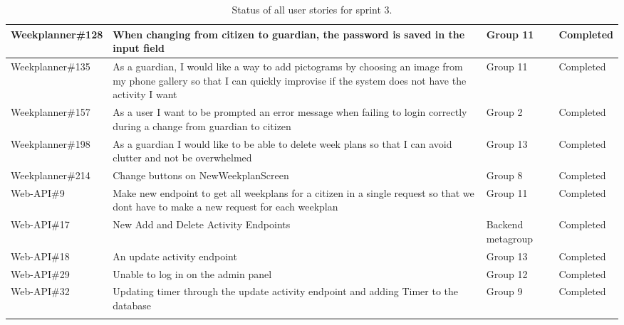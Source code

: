 \begin{longtable}{|p{2.9cm}|p{8cm}|p{2cm}|p{2cm}|}
    Weekplanner\#128 & When changing from citizen to guardian, the password is saved in the input field                                                                                                        & Group 11     & Completed    \\ \hline
    Weekplanner\#135 & As a guardian, I would like a way to add pictograms by choosing an image from my phone gallery so that I can quickly improvise if the system does not have the activity I want          & Group 11     & Completed   \\ \hline
    Weekplanner\#157 & As a user I want to be prompted an error message when failing to login correctly during a change from guardian to citizen                                                               & Group 2      & Completed    \\ \hline
    Weekplanner\#198 & As a guardian I would like to be able to delete week plans so that I can avoid clutter and not be overwhelmed                                                                           & Group 13     & Completed    \\ \hline
    Weekplanner\#214 & Change buttons on NewWeekplanScreen                                                                                                                                                     & Group 8      & Completed    \\ \hline
    Web-API\#9 & Make new endpoint to get all weekplans for a citizen in a single request so that we dont have to make a new request for each weekplan                                                                                                                                                      & Group 11      & Completed    \\ \hline
    Web-API\#17 & New Add and Delete Activity Endpoints                                                                                                                                                      & Backend metagroup     & Completed    \\ \hline
    Web-API\#18 & An update activity endpoint                                                                                                                                                      & Group 13     & Completed    \\ \hline
    Web-API\#29 & Unable to log in on the admin panel                                                                                                                                                       & Group 12     & Completed    \\ \hline
    Web-API\#32 & Updating timer through the update activity endpoint and adding Timer to the database                                                                                                                                                       & Group 9     & Completed    \\ \hline
    \caption{Status of all user stories for sprint 3.}\label{table:sprint-4-review}
\end{longtable}

